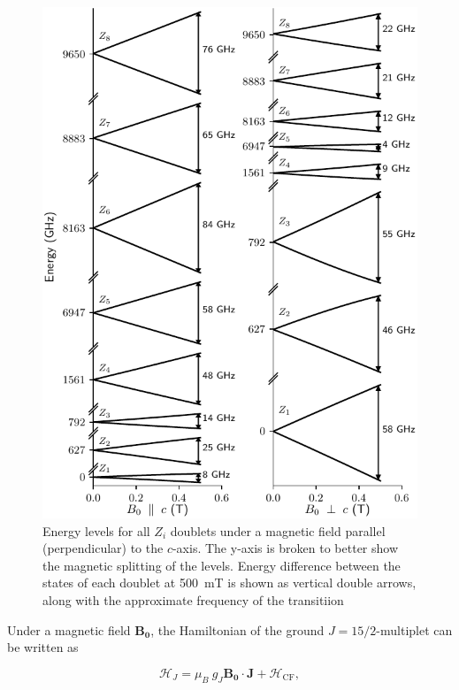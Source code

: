 \begin{figure}
    \includegraphics{chapter2/figures/energy_levels_vs_Bz_all.pdf}
    \caption[Crystal field levels]{Energy levels for all $Z_i$ doublets under a magnetic field parallel (perpendicular) to the $c$-axis. The y-axis is broken to better show the magnetic splitting of the levels. Energy difference between the states of each doublet at 500~mT is shown as vertical double arrows, along with the approximate frequency of the transitiion}
\end{figure}

Under a magnetic field $\mathbf{B_0}$, the Hamiltonian of the ground $J=15/2$-multiplet can be written as 

\begin{equation}
    \label{eq:J-CF_Hamiltonian}
    \mathcal{H}_J = \mu_B \ g_J\mathbf{B_0}\cdot \mathbf{J} + \mathcal{H}_{\mathrm{CF}},
\end{equation}

